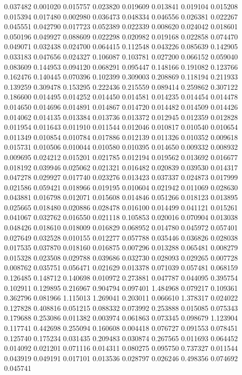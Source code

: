 0.037482
0.001020
0.015757
0.023820
0.019609
0.013841
0.019104
0.015208
0.015394
0.017480
0.002980
0.036473
0.048334
0.046556
0.026381
0.022267
0.045551
0.042790
0.017723
0.052389
0.022339
0.008620
0.024042
0.018601
0.050196
0.049927
0.088609
0.022298
0.020982
0.019168
0.022858
0.074470
0.049071
0.032438
0.024700
0.064415
0.112548
0.043226
0.085639
0.142905
0.033183
0.047656
0.024327
0.106087
0.103781
0.027200
0.066152
0.059040
0.083609
0.144953
0.094120
0.068291
0.095447
0.148166
0.191082
0.123766
0.162476
0.140445
0.070396
0.102399
0.309003
0.208869
0.118194
0.211933
0.139259
0.309478
0.153295
0.222436
0.215559
0.089414
0.259862
0.307122
0.186600
0.014495
0.014252
0.014450
0.014581
0.014235
0.014454
0.014478
0.014650
0.014696
0.014891
0.014867
0.014720
0.014482
0.014509
0.014426
0.014062
0.014135
0.013384
0.013736
0.013372
0.012945
0.012359
0.012828
0.011954
0.011643
0.011910
0.011544
0.012046
0.010817
0.010540
0.010654
0.011349
0.010854
0.010784
0.017886
0.012139
0.011326
0.010352
0.009618
0.015731
0.010506
0.010044
0.010580
0.010395
0.014650
0.009332
0.008932
0.009695
0.024212
0.015201
0.021785
0.012194
0.019562
0.013692
0.016677
0.018192
0.039946
0.025062
0.021321
0.016482
0.020839
0.039530
0.014317
0.047278
0.029927
0.017740
0.023276
0.013423
0.037337
0.024873
0.017999
0.021586
0.059421
0.018966
0.019195
0.010604
0.021942
0.011069
0.028630
0.043881
0.016798
0.012071
0.015608
0.014846
0.051266
0.018123
0.013895
0.025665
0.018480
0.020886
0.028478
0.016100
0.014499
0.041121
0.015261
0.041067
0.032762
0.016550
0.021118
0.105853
0.020016
0.070904
0.013038
0.048426
0.018610
0.018009
0.016829
0.068952
0.014780
0.045972
0.057401
0.027649
0.032528
0.010155
0.012277
0.057788
0.035446
0.036826
0.028038
0.017535
0.037870
0.018160
0.016875
0.007296
0.013288
0.065481
0.008279
0.015328
0.023508
0.029788
0.039686
0.032730
0.028093
0.029265
0.007728
0.008762
0.035751
0.056471
0.021629
0.013378
0.071039
0.057481
0.068159
0.126485
0.148712
0.140698
0.010972
0.273881
0.047787
0.044095
0.395754
0.102911
0.129895
0.216967
0.904794
0.097401
1.484968
0.079217
0.109361
0.362796
0.081966
1.115013
1.269041
0.203011
0.066610
1.378317
0.024022
0.127828
0.408816
0.051215
0.088332
0.073992
0.253888
0.015085
0.075343
0.179688
0.253086
0.011382
0.003974
0.061863
0.073345
0.098679
1.123904
0.117741
0.442698
0.255094
0.160608
0.004418
0.076727
0.091553
0.078451
0.125740
0.175234
0.031435
0.209483
0.030874
0.267565
0.011693
0.064452
0.014092
0.021201
0.071116
0.014311
0.080275
0.095750
0.737327
0.011544
0.043919
0.049191
0.017101
0.013536
0.028797
0.026246
0.498356
0.074692
0.045741
